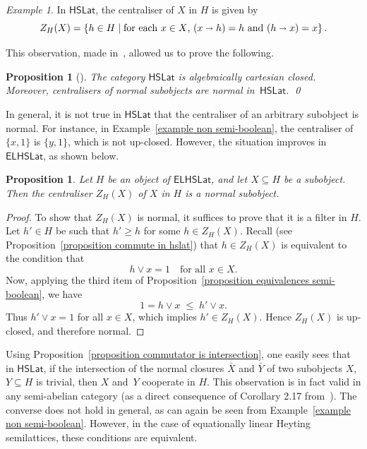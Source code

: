 \documentclass[reqno,a4paper]{amsart}
\newtheorem{proposition}[lemma]{Proposition}
\theoremstyle{remark}
\newtheorem{example}[lemma]{Example}
\theoremstyle{definition}
\newcommand{\noproof}{\hfill \qed}
\newcommand{\oleq}{\subseteq} %
\newcommand{\iimplies}{\shortrightarrow}
\newcommand{\HSLat}{\ensuremath{\mathsf{HSLat}}}
\newcommand{\ELHSLat}{\ensuremath{\mathsf{ELHSLat}}}
\renewcommand{\leq}{\leqslant}
\renewcommand{\geq}{\geqslant}
\begin{document}
\begin{example}
	In \(\HSLat\), the centraliser of \(X\) in \(H\) is given by
	\[
		Z_H(X)
		= \{h\in H \mid \text{for each \(x\in X\), \((x\iimplies h)=h\) and \((h\iimplies x)=x\)}\}\, .
	\]
\end{example}

This observation, made in~\cite{HSLat}, allowed us to prove the following.

\begin{proposition}[\cite{HSLat}]\label{Proposition Centralisers}
	The category \(\HSLat\) is algebraically cartesian closed. Moreover, centralisers of normal subobjects are normal in~\(\HSLat\). \noproof
\end{proposition}

In general, it is not true in \(\HSLat\) that the centraliser of an arbitrary subobject is normal. For instance, in Example~\ref{example non semi-boolean}, the centraliser of \( \{x,1\}\) is \( \{y,1\}\), which is not up-closed. However, the situation improves in \(\ELHSLat\), as shown below.

\begin{proposition}\label{proposition centraliser}
	Let \(H\) be an object of \(\ELHSLat\), and let \(X \oleq H\) be a subobject. Then the centraliser \(Z_H(X)\) of \(X\) in \(H\) is a normal subobject.
\end{proposition}

\begin{proof}
	To show that \(Z_H(X)\) is normal, it suffices to prove that it is a filter in \(H\). Let \(h'\in H\) be such that \(h' \geq h\) for some \(h\in Z_H(X)\). Recall (see Proposition~\ref{proposition commute in hslat}) that \(h\in Z_H(X)\) is equivalent to the condition that
	\[
		h \vee x = 1 \quad \text{for all \(x\in X\).}
	\]
	Now, applying the third item of Proposition~\ref{proposition equivalences semi-boolean}, we have
	\[
		1 = h \vee x \;\leq\; h' \vee x .
	\]
	Thus \(h'\vee x = 1\) for all \(x\in X\), which implies \(h' \in Z_H(X)\). Hence \(Z_H(X)\) is up-closed, and therefore normal.
\end{proof}

Using Proposition~\ref{proposition commutator is intersection}, one easily sees that in \(\HSLat\), if the intersection of the normal closures \(\bar X\) and \(\bar Y\) of two subobjects \(X\), \(Y \oleq H\) is trivial, then \(X\) and~\(Y\) cooperate in \(H\). This observation is in fact valid in any semi-abelian category (as a direct consequence of Corollary 2.17 from~\cite{HSLat}). The converse does not hold in general, as can again be seen from Example~\ref{example non semi-boolean}. However, in the case of equationally linear Heyting semilattices, these conditions are equivalent.
\end{document}
